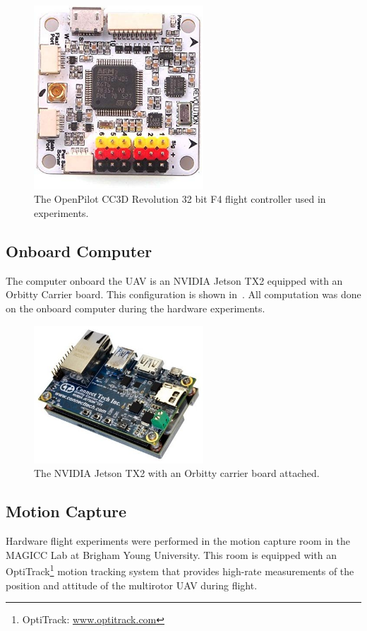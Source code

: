 \begin{figure}[htbp]
  \centering
  \includegraphics[width=2.5in]{figures/f4.jpg}
  \caption[OpenPilot CC3D Revolution 32 bit F4]{ The OpenPilot CC3D Revolution 32
  bit F4 flight controller used in experiments.}
%
  \label{fig:f4}
\end{figure}

\subsection{Onboard Computer}
The computer onboard the UAV is an NVIDIA Jetson TX2 equipped with an Orbitty
Carrier board. This configuration is shown in~. All
computation was done on the onboard computer during the hardware experiments.

\begin{figure}[h]
  \centering
  \includegraphics[width=2.5in]{figures/tx2_orbitty.jpg}
  \caption[NVIDIA Jetson TX2 with Orbitty Carrier Board]{The NVIDIA Jetson TX2
  with an Orbitty carrier board attached.
  }
%
  \label{fig:tx2_orbitty}
\end{figure}

\subsection{Motion Capture}
Hardware flight experiments were performed in the motion capture room in the
MAGICC Lab at Brigham Young University. This room is equipped with an OptiTrack\footnote{OptiTrack:
\href{www.optitrack.com}{www.optitrack.com}} motion tracking system that
provides high-rate measurements of the position and attitude of the multirotor
UAV during flight.


